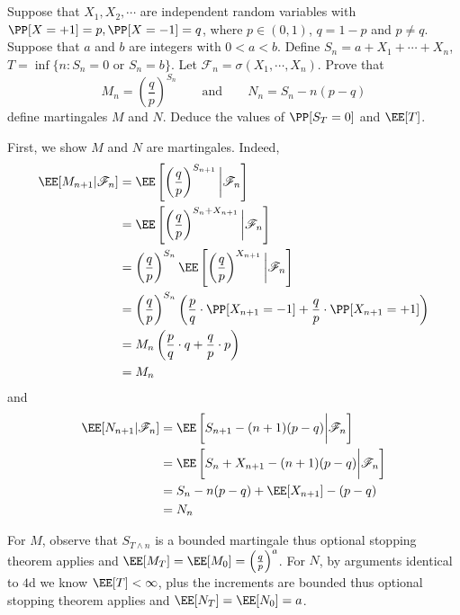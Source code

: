 \documentclass[11pt, headheight=30pt]{scrartcl}
\begin{document}
\section{}
\setcounter{prob*}{4}
\begin{prob*}
    Suppose that $X_1, X_2, \cdots$ are independent random variables with
    $\PP[X = +1] = p, \PP[X = -1] = q$,
    where $p \in (0, 1)$, $q = 1 - p$ and $p \neq q$. Suppose that $a$ and $b$ are integers with $0 < a < b$. Define
    $S_n = a + X_1 + \cdots + X_n$, $T = \inf\{n : S_n = 0 \text{ or } S_n = b\}$.
    Let $\mathscr{F}_n = \sigma(X_1, \cdots , X_n)$. Prove that
    \[
        M_n =
        \left(
            \frac{q}{p}
        \right)^{S_n}
        \qquad
        \text{and}
        \qquad
        N_n = S_n - n(p - q)
    \]
    define martingales $M$ and $N$. Deduce the values of $\PP[S_T = 0]$ and $\EE[T]$.
\end{prob*}

First, we show $M$ and $N$ are martingales. Indeed,
\begin{align*}
    \EE[M_{n+1} | \mathscr{F}_n] &= \EE\left[
        \left(
            \frac{q}{p}
        \right)^{S_{n+1}}
        \bigg|
        \mathscr{F}_n
    \right]\\
    &= \EE\left[
        \left(
            \frac{q}{p}
        \right)^{S_n + X_{n+1}}
        \bigg|
        \mathscr{F}_n
    \right]\\
    &= \left(\frac{q}{p}\right)^{S_n}
    \EE\left[
        \left(
            \frac{q}{p}
        \right)^{X_{n+1}}
        \bigg|
        \mathscr{F}_n
    \right]\\
    &= \left(\frac{q}{p}\right)^{S_n}
    \left( \frac{p}{q}\cdot \PP[X_{n+1} = -1] + \frac{q}{p}\cdot \PP[X_{n+1} = +1]\right)\\
    &= M_n
    \left( \frac{p}{q}\cdot q + \frac{q}{p}\cdot p\right)\\
    &= M_n
\end{align*}
and
\begin{align*}
    \EE[N_{n+1} | \mathscr{F}_n] &= \EE\left[
        S_{n+1} - (n+1)(p - q)
        \bigg|
        \mathscr{F}_n
    \right]\\
    &= \EE\left[
        S_n + X_{n+1} - (n+1)(p - q)
        \bigg|
        \mathscr{F}_n
    \right]\\
    &= S_n - n(p - q) + \EE[X_{n+1}] - (p - q)\\
    &= N_n
\end{align*}


For $M$, observe that $S_{T\land n}$ is a bounded martingale thus optional
stopping theorem applies and $\EE[M_T] = \EE[M_0] = \left(\frac{q}{p}\right)^a$. For $N$, by arguments identical
to $4$d we know $\EE[T] < \infty$, plus the increments are bounded thus
optional stopping theorem applies and $\EE[N_T] = \EE[N_0] = a$.
\end{document}
